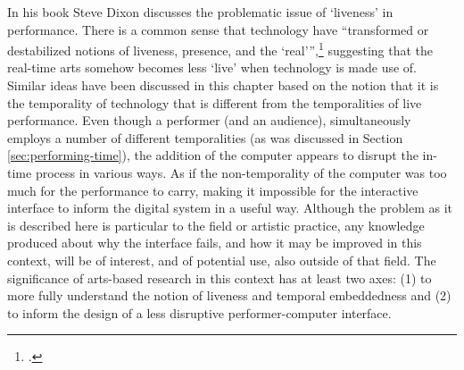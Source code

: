 In his book  Steve Dixon discusses the problematic issue of `liveness' in performance. There is a common sense that technology have ``transformed or destabilized notions of liveness, presence, and the `real''',\footcite[127]{dixon07} suggesting that the real-time arts somehow becomes less `live' when technology is made use of. Similar ideas have been discussed in this chapter based on the notion that it is the temporality of technology that is different from the temporalities of live performance. Even though a performer (and an audience), simultaneously employs a number of different temporalities (as was discussed in Section \ref{sec:performing-time}), the addition of the computer appears to disrupt the in-time process in various ways. As if the non-temporality of the computer was too much for the performance to carry, making it impossible for the interactive interface to inform the digital system in a useful way. Although the problem as it is described here is particular to the field or artistic practice, any knowledge produced about why the interface fails, and how it may be improved in this context, will be of interest, and of potential use, also outside of that field. The significance of arts-based research in this context has at least two axes: (1) to more fully understand the notion of liveness and temporal embeddedness and (2) to inform the design of a less disruptive performer-computer interface.

